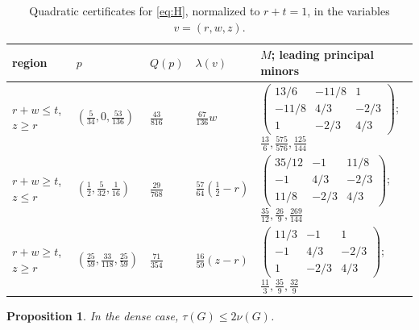 \documentclass{amsart}
\newtheorem{proposition}[theorem]{Proposition}
\theoremstyle{definition}
\theoremstyle{remark}
\numberwithin{equation}{section}
\numberwithin{table}{section}
\begin{document}
\begin{table}[t]
\caption{Quadratic certificates for \eqref{eq:H}, normalized to $r+t=1$, in the variables $v=(r,w,z)$.}\label{tab:quadratic}
\small
\renewcommand{\arraystretch}{1.6}
\begin{tabular}{@{}lllll@{}}
\toprule
region & $p$ & $Q(p)$ & $\lambda(v)$ & $M$; leading principal minors\\
\midrule\addlinespace[4pt]
$r+w\le t$, $z\ge r$ & $(\frac5{34},0,\frac{53}{136})$ & $\frac{43}{816}$ & $\frac{67}{136}w$ &
$\left(\begin{smallmatrix}13/6&-11/8&1\\-11/8&4/3&-2/3\\1&-2/3&4/3\end{smallmatrix}\right)$; $\frac{13}6,\frac{575}{576},\frac{125}{144}$\\[10pt]
$r+w\ge t$, $z\le r$ & $(\frac12,\frac5{32},\frac1{16})$ & $\frac{29}{768}$ & $\frac{57}{64}(\frac12-r)$ &
$\left(\begin{smallmatrix}35/12&-1&11/8\\-1&4/3&-2/3\\11/8&-2/3&4/3\end{smallmatrix}\right)$; $\frac{35}{12},\frac{26}9,\frac{269}{144}$\\[10pt]
$r+w\ge t$, $z\ge r$ & $(\frac{25}{59},\frac{33}{118},\frac{25}{59})$ & $\frac{71}{354}$ & $\frac{16}{59}(z-r)$ &
$\left(\begin{smallmatrix}11/3&-1&1\\-1&4/3&-2/3\\1&-2/3&4/3\end{smallmatrix}\right)$; $\frac{11}3,\frac{35}9,\frac{32}9$\\[6pt]
\bottomrule
\end{tabular}
\end{table}

\begin{proposition}\label{prop:densefinite}
In the dense case, $\tau(G)\le2\nu(G)$.
\end{proposition}
\end{document}
